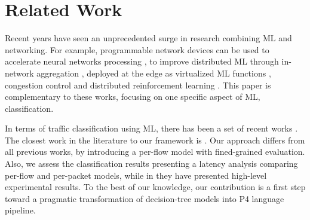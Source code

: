 \section{Related Work}\label{sec:rw}


Recent years have seen an unprecedented surge in research combining ML and networking. For example, programmable network devices can be used to accelerate neural networks processing \cite{AIAccelerator}, to improve distributed ML through in-network aggregation \cite{DistributedML}, deployed at the edge as virtualized ML functions \cite{MLFV}, congestion control \cite{deeplearning-for-congestioncontrol} and distributed reinforcement learning \cite{Reinf-learning-in-switch}. This paper is complementary to these works, focusing on one specific aspect of ML, classification. 

In terms of traffic classification using ML, there has been a set of recent works \cite{sun2018network, pacheco2018towards, lotfollahi2020deep, dias2019innovative} \cite{xiong2019switches}. 
The closest work in the literature to our framework is \cite{xiong2019switches}. Our approach differs from all previous works, by introducing a per-flow model with fined-grained evaluation. Also, we assess the classification results presenting a latency analysis comparing per-flow and per-packet models, while in \cite{xiong2019switches} they have presented high-level experimental results. To the best of our knowledge, our contribution is a first step toward a pragmatic transformation of decision-tree models into P4 language pipeline.



